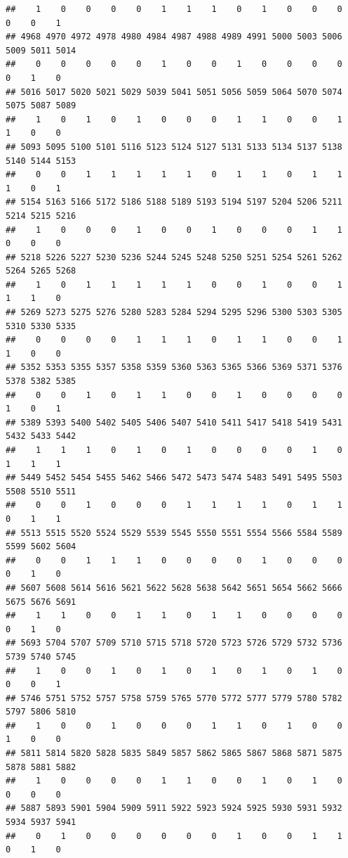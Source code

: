 \documentclass[
]{article}
\begin{document}
\begin{verbatim}
##    1    0    0    0    0    1    1    1    0    1    0    0    0    0    0    1 
## 4968 4970 4972 4978 4980 4984 4987 4988 4989 4991 5000 5003 5006 5009 5011 5014 
##    0    0    0    0    0    1    0    0    1    0    0    0    0    0    1    0 
## 5016 5017 5020 5021 5029 5039 5041 5051 5056 5059 5064 5070 5074 5075 5087 5089 
##    1    0    1    0    1    0    0    0    1    1    0    0    1    1    0    0 
## 5093 5095 5100 5101 5116 5123 5124 5127 5131 5133 5134 5137 5138 5140 5144 5153 
##    0    0    1    1    1    1    1    0    1    1    0    1    1    1    0    1 
## 5154 5163 5166 5172 5186 5188 5189 5193 5194 5197 5204 5206 5211 5214 5215 5216 
##    1    0    0    0    1    0    0    1    0    0    0    1    1    0    0    0 
## 5218 5226 5227 5230 5236 5244 5245 5248 5250 5251 5254 5261 5262 5264 5265 5268 
##    1    0    1    1    1    1    1    0    0    1    0    0    1    1    1    0 
## 5269 5273 5275 5276 5280 5283 5284 5294 5295 5296 5300 5303 5305 5310 5330 5335 
##    0    0    0    0    1    1    1    0    1    1    0    0    1    1    0    0 
## 5352 5353 5355 5357 5358 5359 5360 5363 5365 5366 5369 5371 5376 5378 5382 5385 
##    0    0    1    0    1    1    0    0    1    0    0    0    0    1    0    1 
## 5389 5393 5400 5402 5405 5406 5407 5410 5411 5417 5418 5419 5431 5432 5433 5442 
##    1    1    1    0    1    0    1    0    0    0    0    1    0    1    1    1 
## 5449 5452 5454 5455 5462 5466 5472 5473 5474 5483 5491 5495 5503 5508 5510 5511 
##    0    0    1    0    0    0    1    1    1    1    0    1    1    0    1    1 
## 5513 5515 5520 5524 5529 5539 5545 5550 5551 5554 5566 5584 5589 5599 5602 5604 
##    0    0    1    1    1    0    0    0    0    1    0    0    0    0    1    0 
## 5607 5608 5614 5616 5621 5622 5628 5638 5642 5651 5654 5662 5666 5675 5676 5691 
##    1    1    0    0    1    1    0    1    1    0    0    0    0    0    1    0 
## 5693 5704 5707 5709 5710 5715 5718 5720 5723 5726 5729 5732 5736 5739 5740 5745 
##    1    0    0    1    0    1    0    1    0    1    0    1    0    0    0    1 
## 5746 5751 5752 5757 5758 5759 5765 5770 5772 5777 5779 5780 5782 5797 5806 5810 
##    1    0    0    1    0    0    0    1    1    0    1    0    0    1    0    0 
## 5811 5814 5820 5828 5835 5849 5857 5862 5865 5867 5868 5871 5875 5878 5881 5882 
##    1    0    0    0    0    1    1    0    0    1    0    1    0    0    0    0 
## 5887 5893 5901 5904 5909 5911 5922 5923 5924 5925 5930 5931 5932 5934 5937 5941 
##    0    1    0    0    0    0    0    0    1    0    0    1    1    0    1    0 

\end{verbatim}
\end{document}
